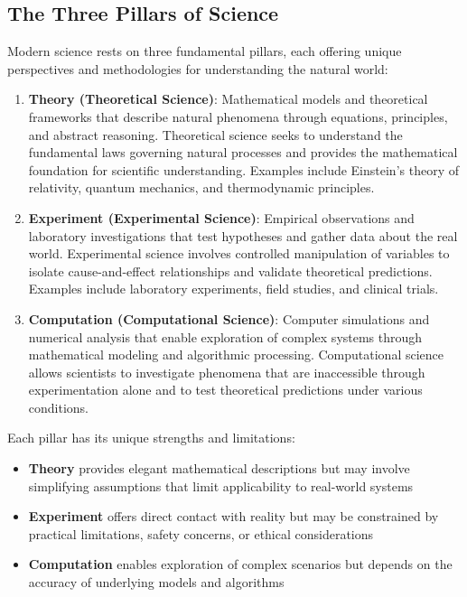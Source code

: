 \subsection{The Three Pillars of Science}

Modern science rests on three fundamental pillars, each offering unique perspectives and methodologies for understanding the natural world:

\begin{enumerate}
  \item \textbf{Theory (Theoretical Science)}: Mathematical models and theoretical frameworks that describe natural phenomena through equations, principles, and abstract reasoning. Theoretical science seeks to understand the fundamental laws governing natural processes and provides the mathematical foundation for scientific understanding. Examples include Einstein's theory of relativity, quantum mechanics, and thermodynamic principles.
      
  \item \textbf{Experiment (Experimental Science)}: Empirical observations and laboratory investigations that test hypotheses and gather data about the real world. Experimental science involves controlled manipulation of variables to isolate cause-and-effect relationships and validate theoretical predictions. Examples include laboratory experiments, field studies, and clinical trials.
      
  \item \textbf{Computation (Computational Science)}: Computer simulations and numerical analysis that enable exploration of complex systems through mathematical modeling and algorithmic processing. Computational science allows scientists to investigate phenomena that are inaccessible through experimentation alone and to test theoretical predictions under various conditions.
\end{enumerate}

Each pillar has its unique strengths and limitations:

\begin{itemize}
  \item \textbf{Theory} provides elegant mathematical descriptions but may involve simplifying assumptions that limit applicability to real-world systems
  \item \textbf{Experiment} offers direct contact with reality but may be constrained by practical limitations, safety concerns, or ethical considerations
  \item \textbf{Computation} enables exploration of complex scenarios but depends on the accuracy of underlying models and algorithms
\end{itemize}

